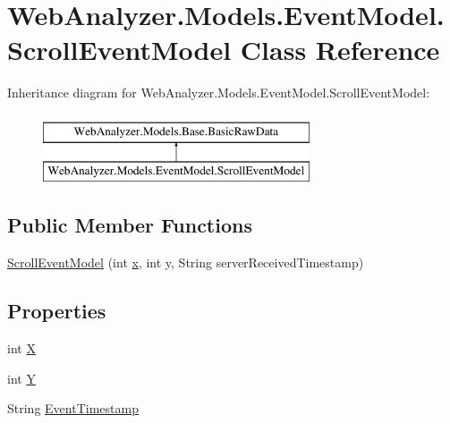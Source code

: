 \hypertarget{class_web_analyzer_1_1_models_1_1_event_model_1_1_scroll_event_model}{}\section{Web\+Analyzer.\+Models.\+Event\+Model.\+Scroll\+Event\+Model Class Reference}
\label{class_web_analyzer_1_1_models_1_1_event_model_1_1_scroll_event_model}
Inheritance diagram for Web\+Analyzer.\+Models.\+Event\+Model.\+Scroll\+Event\+Model\+:\begin{figure}[H]
\begin{center}
\leavevmode
\includegraphics[height=2.000000cm]{class_web_analyzer_1_1_models_1_1_event_model_1_1_scroll_event_model}
\end{center}
\end{figure}
\subsection*{Public Member Functions}
\begin{DoxyCompactItemize}
\item 
\hyperlink{class_web_analyzer_1_1_models_1_1_event_model_1_1_scroll_event_model_a6d05c7b6078f127114c37f83e4525c7c}{Scroll\+Event\+Model} (int \hyperlink{_u_i_2_h_t_m_l_resources_2js_2lib_2underscore_8min_8js_a81e910173af87b1161e719a504d52407}{x}, int y, String server\+Received\+Timestamp)
\end{DoxyCompactItemize}
\subsection*{Properties}
\begin{DoxyCompactItemize}
\item 
int \hyperlink{class_web_analyzer_1_1_models_1_1_event_model_1_1_scroll_event_model_a1c26ae943594a9bca613d4bed1f736ca}{X}
\item 
int \hyperlink{class_web_analyzer_1_1_models_1_1_event_model_1_1_scroll_event_model_a2247392c27cb5d65d023966dcf9a899d}{Y}
\item 
String \hyperlink{class_web_analyzer_1_1_models_1_1_event_model_1_1_scroll_event_model_a7428a050a8d234f9a56b9ef26cfd78a7}{Event\+Timestamp}
\end{DoxyCompactItemize}
